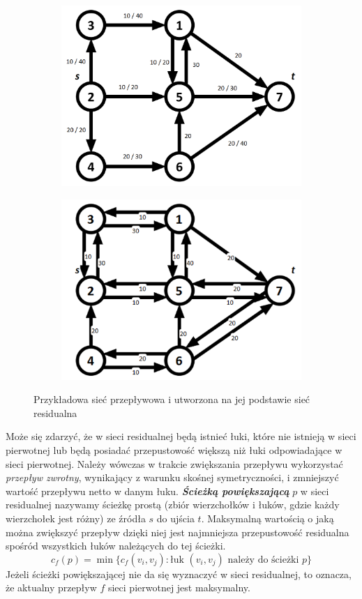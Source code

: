 \begin{figure}[H]
	\centering
	\begin{subfigure}{0.45\textwidth}
		\includegraphics[width=0.9\linewidth]{./img/residual1.png} 
		\caption{}
		\label{fig:residual1}
	\end{subfigure}
	\begin{subfigure}{0.45\textwidth}
		\includegraphics[width=0.9\linewidth]{./img/residual2.png}
		\caption{}
		\label{fig:residual2}
	\end{subfigure}
	\caption{Przykładowa sieć przepływowa i utworzona na jej podstawie sieć residualna}
	\label{fig:residual}
\end{figure}
Może się zdarzyć, że w sieci residualnej będą istnieć łuki, które nie istnieją w sieci pierwotnej lub będą posiadać przepustowość większą niż łuki odpowiadające w sieci pierwotnej. Należy wówczas w trakcie zwiększania przepływu wykorzystać \textit{przepływ zwrotny}, wynikający z warunku skośnej symetryczności, i zmniejszyć wartość przepływu netto w danym łuku.\newpage\indent
\textit{\textbf{Ścieżką powiększającą}} $ p $ w sieci residualnej nazywamy ścieżkę prostą (zbiór wierzchołków i łuków, gdzie każdy wierzchołek jest różny) ze źródła $ s $ do ujścia $ t $. Maksymalną wartością o jaką można zwiększyć przepływ dzięki niej jest najmniejsza przepustowość residualna spośród wszystkich łuków należących do tej ścieżki.
$$ c_f(p)=\min\{ c_f(v_i,v_j):\text{łuk } (v_i,v_j) \text{ należy do ścieżki }p\} $$
Jeżeli ścieżki powiększającej nie da się wyznaczyć w sieci residualnej, to oznacza, że aktualny przepływ $ f $ sieci pierwotnej jest maksymalny.
